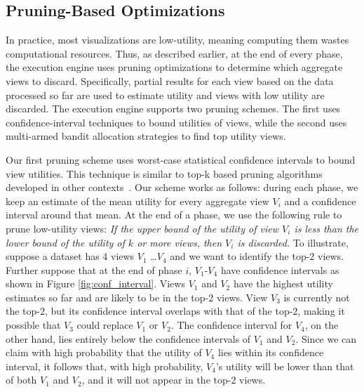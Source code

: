 

\subsection{Pruning-Based Optimizations}
\label{sec:pruning_opt}
In practice, most visualizations are low-utility, meaning computing them wastes computational resources.
Thus, as described earlier, at the end of every phase, 
the execution engine uses pruning optimizations to determine which 
aggregate views to discard.
Specifically, partial results for each view based on the data processed
so far are used to estimate utility and views with low utility are discarded.
The \SeeDB execution engine supports two pruning schemes. The first uses 
confidence-interval techniques to bound utilities of views, while the second uses
multi-armed bandit allocation strategies to find top utility views.





\label{sec:confidence_interval}
Our first pruning scheme uses worst-case statistical confidence intervals to
bound view utilities.
This technique is similar to top-k based pruning algorithms developed 
in other contexts~\cite{DBLP:conf/vldb/IlyasAE04, DBLP:conf/ICDE/ReDS07}.
Our scheme works as follows: during each phase,
we keep an estimate of the mean utility for every aggregate view $V_i$ and a
confidence interval around that mean.
At the end of a phase, we use the following rule to prune low-utility
views:
{\em If the upper bound of the utility of view $V_i$ is less
than the lower bound of the utility of $k$ or more views, then $V_i$ is discarded.}
To illustrate, suppose a dataset has 4 views $V_1$ \ldots $V_4$ and we want to 
identify the top-$2$ views.
Further suppose that at the end of phase $i$,
$V_1$-$V_4$ have confidence intervals as shown in Figure \ref{fig:conf_interval}.
Views $V_1$ and $V_2$ have the highest utility estimates so far and are
likely to be in the top-$2$ views.
View $V_3$ is currently not the top-$2$, but its confidence interval overlaps
with that of the top-$2$, making it possible that $V_3$ could replace $V_1$ or $V_2$.
The confidence interval for $V_4$, on the other hand, lies entirely below the confidence
intervals of $V_1$ and $V_2$.
Since we can claim with high probability
that the utility of $V_4$ lies within its confidence interval, it follows that,
with high probability, $V_4$'s utility will be lower than that of both $V_1$ and
$V_2$, and it will not appear in the top-$2$ views.

